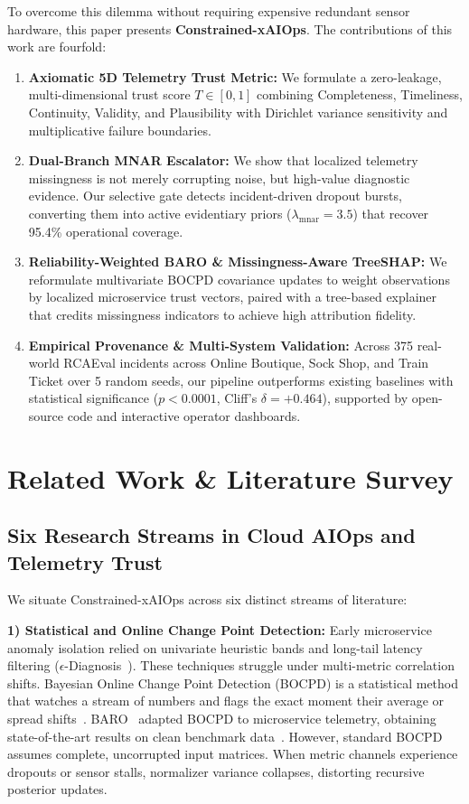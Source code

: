 \documentclass[conference]{IEEEtran}
\begin{document}
To overcome this dilemma without requiring expensive redundant sensor hardware, this paper presents \textbf{Constrained-xAIOps}.
The contributions of this work are fourfold:
\begin{enumerate}
    \item \textbf{Axiomatic 5D Telemetry Trust Metric:} We formulate a zero-leakage, multi-dimensional trust score $T \in [0, 1]$ combining Completeness, Timeliness, Continuity, Validity, and Plausibility with Dirichlet variance sensitivity and multiplicative failure boundaries.
    \item \textbf{Dual-Branch MNAR Escalator:} We show that localized telemetry missingness is not merely corrupting noise, but high-value diagnostic evidence. Our selective gate detects incident-driven dropout bursts, converting them into active evidentiary priors ($\lambda_{\text{mnar}} = 3.5$) that recover 95.4\% operational coverage.
    \item \textbf{Reliability-Weighted BARO \& Missingness-Aware TreeSHAP:} We reformulate multivariate BOCPD covariance updates to weight observations by localized microservice trust vectors, paired with a tree-based explainer that credits missingness indicators to achieve high attribution fidelity.
    \item \textbf{Empirical Provenance \& Multi-System Validation:} Across 375 real-world RCAEval incidents across Online Boutique, Sock Shop, and Train Ticket over 5 random seeds, our pipeline outperforms existing baselines with statistical significance ($p < 0.0001$, Cliff's $\delta = +0.464$), supported by open-source code and interactive operator dashboards.
\end{enumerate}

\section{Related Work \& Literature Survey}

\subsection{Six Research Streams in Cloud AIOps and Telemetry Trust}
We situate Constrained-xAIOps across six distinct streams of literature:

\textbf{1) Statistical and Online Change Point Detection:} Early microservice anomaly isolation relied on univariate heuristic bands and long-tail latency filtering ($\epsilon$-Diagnosis~\cite{shan2019ediagnosis}).
These techniques struggle under multi-metric correlation shifts.
Bayesian Online Change Point Detection (BOCPD) is a statistical method that watches a stream of numbers and flags the exact moment their average or spread shifts~\cite{adams2007bayesian}.
BARO~\cite{pham2024baro} adapted BOCPD to microservice telemetry, obtaining state-of-the-art results on clean benchmark data~\cite{pham2025rcaeval}.
However, standard BOCPD assumes complete, uncorrupted input matrices.
When metric channels experience dropouts or sensor stalls, normalizer variance collapses, distorting recursive posterior updates.
\end{document}
